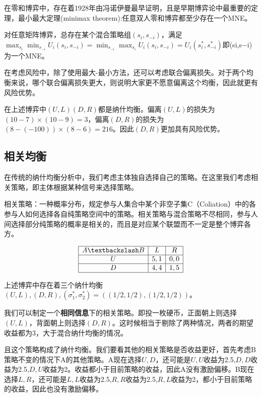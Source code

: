 \documentclass[UTF8,12pt]{ctexart}
\numberwithin{equation}{section} %
\numberwithin{figure}{section}
\numberwithin{table}{section}
\begin{document}
	在零和博弈中，存在着1928年由冯诺伊曼最早证明，且是早期博弈论中最重要的定理，最小最大定理(minimax theorem):任意双人零和博弈都至少存在一个MNE。
	
	对任意矩阵博弈，总存在某个混合策略组$(s_i,s_{-i})$，满足$\max_{s_i}\min_{s_{-i}}U_i(s_i,s_{-i}) = \min_{s_{-i}}\max_{s_i}U_i(s_i,s_{-i}) = U_i(s_i^*,s_{-i}^*)$即(si,s−i)为一个MNE。
	
	在考虑风险中，除了使用最大-最小方法，还可以考虑联合偏离损失。对于两个均衡来说，哪个联合偏离损失更大，则说明大家更不愿意偏离这个均衡，因此就更有风险优势。
	
	在上述博弈中$(U,L)(D,R)$都是纳什均衡。偏离$(U,L)$的损失为$(10-7)\times(10-9) = 3$，偏离$(D,R)$的损失为$(8-(-100))\times(8-6) = 216$。因此$(D,R)$更加具有风险优势。
	
	\subsection{相关均衡}
	在传统的纳什均衡分析中，我们考虑主体独自选择自己的策略。在这里我们考虑相关策略，即主体根据某种信号来选择策略。
	
	相关策略：一种概率分布，规定参与人集合中某个非空子集C（Coliation）中的各参与人如何选择各自纯策略空间中的策略。相关策略与混合策略不尽相同，参与人间选择部分纯策略的概率是相关的，而且是对应某个联盟而不一定是整个博弈各方。
	
	\begin{equation}
		\begin{array}{|c|c|c|}
			\hline
			A \textbackslash B & L & R \\
			\hline 
			U & 5,1 & 0,0 \\
			\hline 
			D & 4,4 & 1,5 \\
			\hline 
		\end{array}
	\end{equation}
	
	上述博弈中存在着三个纳什均衡$(U,L),(D,R),(\sigma_1^*,\sigma_2^*) = ((1/2,1/2),(1/2,1/2))$。
	
	我们可以制定一个\textbf{相同信息}下的相关策略。即投一枚硬币，正面朝上则选择$(U,L)$，背面朝上则选择$(D,R)$。这时候相当于剔除了两种情况，两者的期望收益都为3，大于混合纳什均衡的情况。
	
	且这个策略构成了纳什均衡。我们要看其他的相关策略是否收益更好，首先考虑B策略不变的情况下A的其他策略。A现在选择$U,D$，还可能是$U,U$收益为2.5,$D,D$收益为2.5,$D,U$收益为2。收益都小于目前策略的收益，因此A没有激励偏移。B现在选择$L,R$，还可能是$L,L$收益为2.5,$R,R$收益为2.5,$R,L$收益为2，都小于目前策略的收益，因此也没有激励偏移。
	
\end{document}
